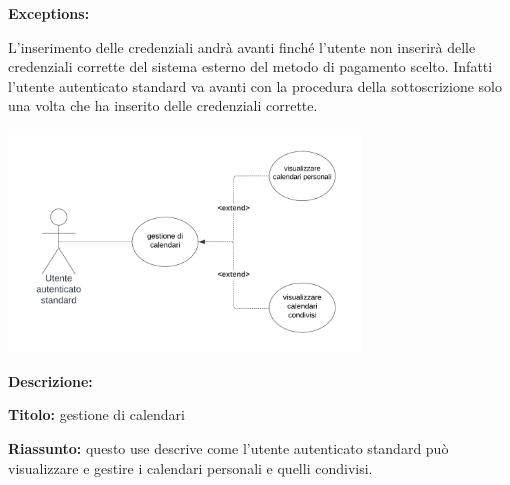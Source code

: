 \begin{listaPersonale}[UC]{}

    \textbf{Exceptions:}
    \begin{enumerate}[label=\textbf{[exception \arabic{enumii}]}, ref= \textbf{[exception \arabic{enumii}]}]
         L'inserimento delle credenziali andrà avanti finché l'utente non inserirà delle credenziali corrette del sistema esterno del metodo di pagamento scelto. Infatti l'utente autenticato standard va avanti con la procedura della sottoscrizione solo una volta che ha inserito delle credenziali corrette.
    \end{enumerate}






    \newpage


    \begin{center}
        \includegraphics[width=0.7\textwidth]{img/Diagrammi/UseCases/CondivisioneCalendario.png}
    \end{center}

    \textbf{Descrizione:}

    \textbf{Titolo:} gestione di calendari

    \textbf{Riassunto:} questo use descrive come l'utente autenticato standard può visualizzare e gestire i calendari personali e quelli condivisi.


\end{listaPersonale}
